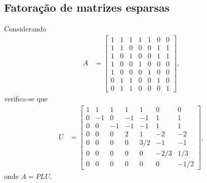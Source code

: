 \subsection{Fatoração de matrizes esparsas}
Considerando
\begin{align*}
    A &= \begin{bmatrix}
        1 & 1 & 1 & 1 & 1 & 0 & 0 \\
        1 & 1 & 0 & 0 & 0 & 1 & 1 \\
        1 & 0 & 1 & 0 & 0 & 1 & 1 \\
        1 & 0 & 0 & 1 & 0 & 0 & 0 \\
        1 & 0 & 0 & 0 & 1 & 0 & 0 \\
        0 & 1 & 1 & 0 & 0 & 1 & 0 \\
        0 & 1 & 1 & 0 & 0 & 0 & 1
    \end{bmatrix},
\end{align*}
verifica-se que
\begin{align*}
    U &= \begin{bmatrix}
        1 &    1 &    1 &    1 &    1 &    0 &    0 \\
        0 &   -1 &    0 &   -1 &   -1 &    1 &    1 \\
        0 &    0 &   -1 &   -1 &   -1 &    1 &    1 \\
        0 &    0 &    0 &    2 &    1 &   -2 &   -2 \\
        0 &    0 &    0 &    0 &  3/2 &   -1 &   -1 \\
        0 &    0 &    0 &    0 &    0 & -2/3 &  1/3 \\
        0 &    0 &    0 &    0 &    0 &    0 & -1/2
    \end{bmatrix},
\end{align*}
onde $A = P L U$.

